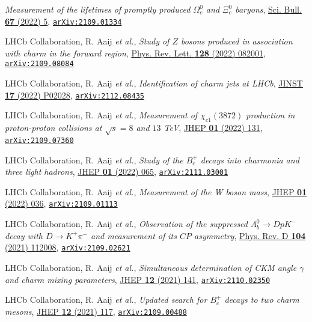 \documentclass[a4paper, 11pt]{article}
\newenvironment{cvcontent}{
  \leftskip=0.5cm\rightskip=0cm
  \noindent\ignorespaces}{\par}
\newcommand{\arxiv}[1]{\href{https://arxiv.org/abs/#1}{\texttt{arXiv:#1}}}
\begin{document}
\begin{cvcontent}
\begin{enumerate}[label={[\arabic*]}, leftmargin=1.5cm]
    \emph{Measurement of the lifetimes of promptly produced $\Omega^{0}_{c}$ and $\Xi^{0}_{c}$ baryons},
    \href{https://doi.org/10.1016/j.scib.2021.11.022}{Sci. Bull. \textbf{67} (2022) 5},
    \arxiv{2109.01334}
    \item LHCb Collaboration, R. Aaij \emph{et al.}, 
    \emph{Study of $Z$ bosons produced in association with charm in the forward region},
    \href{https://journals.aps.org/prl/abstract/10.1103/PhysRevLett.128.082001}{Phys. Rev. Lett. \textbf{128} (2022) 082001},
    \arxiv{2109.08084}
    \item LHCb Collaboration, R. Aaij \emph{et al.}, 
    \emph{Identification of charm jets at LHCb},
    \href{https://doi.org/10.1088/1748-0221/17/02/p02028}{JINST \textbf{17} (2022) P02028},
    \arxiv{2112.08435}
    \item LHCb Collaboration, R. Aaij \emph{et al.}, 
    \emph{Measurement of $\chi_{c1}(3872)$ production in proton-proton collisions at $\sqrt{s}=8$ and $13$ TeV},
    \href{https://doi.org/10.1007/JHEP01(2022)131}{JHEP \textbf{01} (2022) 131},
    \arxiv{2109.07360}
    \item LHCb Collaboration, R. Aaij \emph{et al.}, 
    \emph{Study of the $B_c^+$ decays into charmonia and three light hadrons},
    \href{https://doi.org/10.1007/JHEP01(2022)065}{JHEP \textbf{01} (2022) 065},
    \arxiv{2111.03001}
    \item LHCb Collaboration, R. Aaij \emph{et al.}, 
    \emph{Measurement of the W boson mass}, 
    \href{https://doi.org/10.1007/JHEP01(2022)036}{JHEP \textbf{01} (2022) 036},
    \arxiv{2109.01113}
    \item LHCb Collaboration, R. Aaij \emph{et al.}, 
    \emph{Observation of the suppressed $\Lambda_b^0\to D p K^-$ decay with $D\to K^+ \pi^-$ and measurement of its $C\!P$ asymmetry}, 
    \href{https://link.aps.org/doi/10.1103/PhysRevD.104.112008}{Phys. Rev. D \textbf{104} (2021) 112008},
    \arxiv{2109.02621}
    \item LHCb Collaboration, R. Aaij \emph{et al.}, 
    \emph{Simultaneous determination of CKM angle $\gamma$ and charm mixing parameters},
    \href{https://doi.org/10.1007/JHEP12(2021)141}{JHEP \textbf{12} (2021) 141},
    \arxiv{2110.02350}
    \sloppy
    \item LHCb Collaboration, R. Aaij \emph{et al.}, 
    \emph{Updated search for $B_c^+$ decays to two charm mesons},
    \href{https://doi.org/10.1007/JHEP12(2021)117}{JHEP \textbf{12} (2021) 117},
    \arxiv{2109.00488}

\end{enumerate}
\end{cvcontent}
\end{document}
